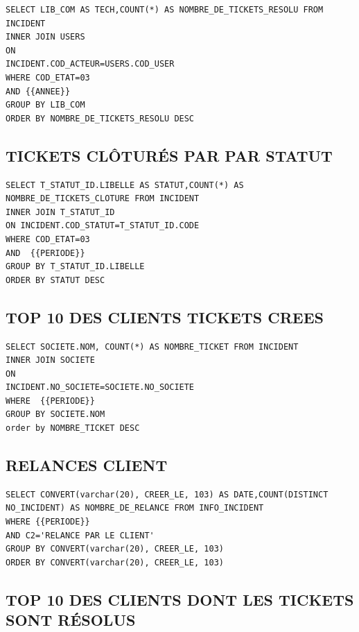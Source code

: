 \documentclass[a4paper,12pt]{report}
\begin{document}
\lstset{
language=SQL,
basicstyle=\footnotesize,
}
\begin{lstlisting}
SELECT LIB_COM AS TECH,COUNT(*) AS NOMBRE_DE_TICKETS_RESOLU FROM INCIDENT 
INNER JOIN USERS 
ON 
INCIDENT.COD_ACTEUR=USERS.COD_USER
WHERE COD_ETAT=03 
AND {{ANNEE}}
GROUP BY LIB_COM
ORDER BY NOMBRE_DE_TICKETS_RESOLU DESC
\end{lstlisting}

\subsection{TICKETS CLÔTURÉS PAR PAR STATUT} 

\lstset{
language=SQL,
basicstyle=\footnotesize,
}
\begin{lstlisting}
SELECT T_STATUT_ID.LIBELLE AS STATUT,COUNT(*) AS NOMBRE_DE_TICKETS_CLOTURE FROM INCIDENT 
INNER JOIN T_STATUT_ID
ON INCIDENT.COD_STATUT=T_STATUT_ID.CODE
WHERE COD_ETAT=03
AND  {{PERIODE}}
GROUP BY T_STATUT_ID.LIBELLE
ORDER BY STATUT DESC
\end{lstlisting}


\subsection{TOP 10 DES CLIENTS TICKETS CREES} 

\lstset{
language=SQL,
basicstyle=\footnotesize,
}
\begin{lstlisting}
SELECT SOCIETE.NOM, COUNT(*) AS NOMBRE_TICKET FROM INCIDENT
INNER JOIN SOCIETE
ON 
INCIDENT.NO_SOCIETE=SOCIETE.NO_SOCIETE
WHERE  {{PERIODE}} 
GROUP BY SOCIETE.NOM 
order by NOMBRE_TICKET DESC
\end{lstlisting}

\subsection{RELANCES CLIENT} 

\lstset{
language=SQL,
basicstyle=\footnotesize,
}
\begin{lstlisting}
SELECT CONVERT(varchar(20), CREER_LE, 103) AS DATE,COUNT(DISTINCT NO_INCIDENT) AS NOMBRE_DE_RELANCE FROM INFO_INCIDENT 
WHERE {{PERIODE}} 
AND C2='RELANCE PAR LE CLIENT'
GROUP BY CONVERT(varchar(20), CREER_LE, 103)
ORDER BY CONVERT(varchar(20), CREER_LE, 103) 
\end{lstlisting}

\subsection{TOP 10 DES CLIENTS DONT LES TICKETS SONT RÉSOLUS} 
\end{document}
